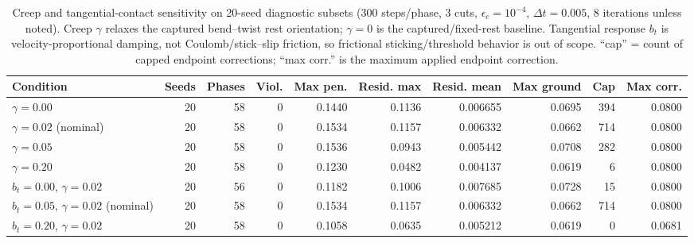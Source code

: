 \begin{table}[t]
  \centering
  \small
  \setlength{\tabcolsep}{4pt}
  \caption{Creep and tangential-contact sensitivity on 20-seed diagnostic subsets (300 steps/phase, 3 cuts, $\epsilon_c{=}10^{-4}$, $\Delta t{=}0.005$, 8 iterations unless noted). Creep $\gamma$ relaxes the captured bend--twist rest orientation; $\gamma{=}0$ is the captured/fixed-rest baseline. Tangential response $b_t$ is velocity-proportional damping, not Coulomb/stick--slip friction, so frictional sticking/threshold behavior is out of scope. ``cap'' = count of capped endpoint corrections; ``max corr.'' is the maximum applied endpoint correction.}
  \label{tab:sensitivity}
  \begin{tabular}{lrrrrrrrrr}
    \hline
    Condition & Seeds & Phases & Viol. & Max pen. & Resid. max & Resid. mean & Max ground & Cap & Max corr. \\
    \hline
    $\gamma=0.00$ & 20 & 58 & 0 & 0.1440 & 0.1136 & 0.006655 & 0.0695 & 394 & 0.0800 \\
    $\gamma=0.02$ (nominal) & 20 & 58 & 0 & 0.1534 & 0.1157 & 0.006332 & 0.0662 & 714 & 0.0800 \\
    $\gamma=0.05$ & 20 & 58 & 0 & 0.1536 & 0.0943 & 0.005442 & 0.0708 & 282 & 0.0800 \\
    $\gamma=0.20$ & 20 & 58 & 0 & 0.1230 & 0.0482 & 0.004137 & 0.0619 & 6 & 0.0800 \\
    $b_t=0.00$, $\gamma{=}0.02$ & 20 & 56 & 0 & 0.1182 & 0.1006 & 0.007685 & 0.0728 & 15 & 0.0800 \\
    $b_t=0.05$, $\gamma{=}0.02$ (nominal) & 20 & 58 & 0 & 0.1534 & 0.1157 & 0.006332 & 0.0662 & 714 & 0.0800 \\
    $b_t=0.20$, $\gamma{=}0.02$ & 20 & 58 & 0 & 0.1058 & 0.0635 & 0.005212 & 0.0619 & 0 & 0.0681 \\
    \hline
  \end{tabular}
\end{table}
